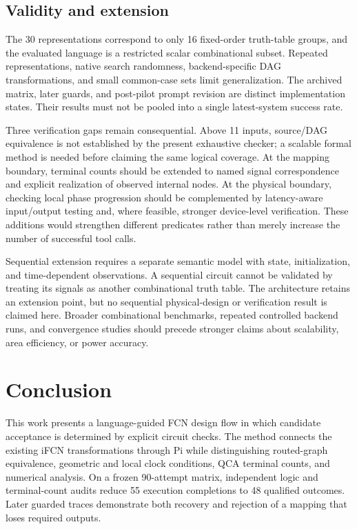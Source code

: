 \documentclass[ASNA,twocolumn]{USG}
\begin{document}
\subsection{Validity and extension}
The 30 representations correspond to only 16 fixed-order truth-table groups, and the evaluated language is a restricted scalar combinational subset. Repeated representations, native search randomness, backend-specific DAG transformations, and small common-case sets limit generalization. The archived matrix, later guards, and post-pilot prompt revision are distinct implementation states. Their results must not be pooled into a single latest-system success rate.

Three verification gaps remain consequential. Above 11 inputs, source/DAG equivalence is not established by the present exhaustive checker; a scalable formal method is needed before claiming the same logical coverage. At the mapping boundary, terminal counts should be extended to named signal correspondence and explicit realization of observed internal nodes. At the physical boundary, checking local phase progression should be complemented by latency-aware input/output testing and, where feasible, stronger device-level verification. These additions would strengthen different predicates rather than merely increase the number of successful tool calls.

Sequential extension requires a separate semantic model with state, initialization, and time-dependent observations. A sequential circuit cannot be validated by treating its signals as another combinational truth table. The architecture retains an extension point, but no sequential physical-design or verification result is claimed here. Broader combinational benchmarks, repeated controlled backend runs, and convergence studies should precede stronger claims about scalability, area efficiency, or power accuracy.

\section{Conclusion}\label{sec:conclusion}
This work presents a language-guided FCN design flow in which candidate acceptance is determined by explicit circuit checks. The method connects the existing iFCN transformations through Pi while distinguishing routed-graph equivalence, geometric and local clock conditions, QCA terminal counts, and numerical analysis. On a frozen 90-attempt matrix, independent logic and terminal-count audits reduce 55 execution completions to 48 qualified outcomes. Later guarded traces demonstrate both recovery and rejection of a mapping that loses required outputs.
\end{document}
